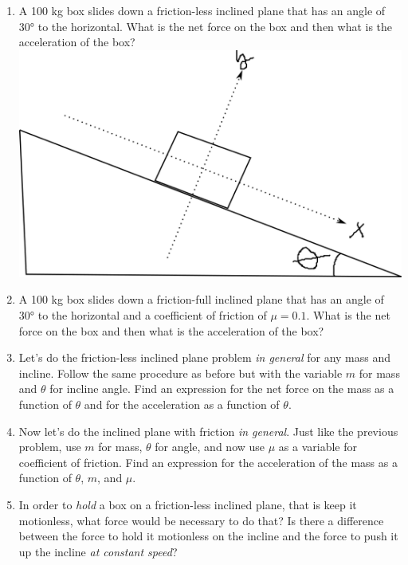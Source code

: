 \begin{enumerate}
\item A 100 kg box slides down a friction-less inclined plane that has an angle of \ang{30} to the horizontal. What is the net force on the box and then what is the acceleration of the box?
\includegraphics[scale=0.75]{week-3-incline-plane.png}
\bigskip

\item A 100 kg box slides down a friction-full inclined plane that has an angle of \ang{30} to the horizontal and a coefficient of friction of $\mu=0.1$. What is the net force on the box and then what is the acceleration of the box?\hugeskip

\item Let's do the friction-less inclined plane problem \emph{in general} for any mass and incline. Follow the same procedure as before but with the variable $m$ for mass and $\theta$ for incline angle. Find an expression for the net force on the mass as a function of $\theta$ and for the acceleration as a function of $\theta$.\giantskip 

\item Now let's do the inclined plane with friction \emph{in general}. Just like the previous problem, use $m$ for mass, $\theta$ for angle, and now use $\mu$ as a variable for coefficient of friction. Find an expression for the acceleration of the mass as a function of $\theta$, $m$, and $\mu$. \giantskip

\item In order to \emph{hold} a box on a friction-less inclined plane, that is keep it motionless, what force would be necessary to do that? Is there a difference between the force to hold it motionless on the incline and the force to push it up the incline \emph{at constant speed}? \hugeskip


\end{enumerate}
